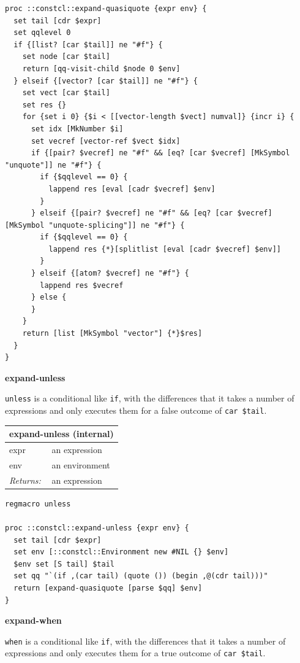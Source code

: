 \documentclass[twoside,9pt]{report}
\begin{document}
\noindent\makebox[\linewidth]{\rule{\linewidth}{0.4pt}}
\begin{lstlisting}
proc ::constcl::expand-quasiquote {expr env} {
  set tail [cdr $expr]
  set qqlevel 0
  if {[list? [car $tail]] ne "#f"} {
    set node [car $tail]
    return [qq-visit-child $node 0 $env]
  } elseif {[vector? [car $tail]] ne "#f"} {
    set vect [car $tail]
    set res {}
    for {set i 0} {$i < [[vector-length $vect] numval]} {incr i} {
      set idx [MkNumber $i]
      set vecref [vector-ref $vect $idx]
      if {[pair? $vecref] ne "#f" && [eq? [car $vecref] [MkSymbol "unquote"]] ne "#f"} {
        if {$qqlevel == 0} {
          lappend res [eval [cadr $vecref] $env]
        }
      } elseif {[pair? $vecref] ne "#f" && [eq? [car $vecref] [MkSymbol "unquote-splicing"]] ne "#f"} {
        if {$qqlevel == 0} {
          lappend res {*}[splitlist [eval [cadr $vecref] $env]]
        }
      } elseif {[atom? $vecref] ne "#f"} {
        lappend res $vecref
      } else {
      }
    }
    return [list [MkSymbol "vector"] {*}$res]
  }
}
\end{lstlisting}
\noindent\makebox[\linewidth]{\rule{\linewidth}{0.4pt}}

\textbf{expand-unless}


\texttt{unless} is a conditional like \texttt{if}, with the differences that it takes a number of expressions and only executes them for a false outcome of \texttt{car \$tail}.

\begin{tabular}{ |l l| }
\hline
\multicolumn{2}{|l|}{expand-unless (internal)} \\
\hline
expr & an expression \\
env & an environment \\
\textit{Returns:} & an expression \\
\hline
\end{tabular}

\noindent\makebox[\linewidth]{\rule{\linewidth}{0.4pt}}
\begin{lstlisting}
regmacro unless
 
proc ::constcl::expand-unless {expr env} {
  set tail [cdr $expr]
  set env [::constcl::Environment new #NIL {} $env]
  $env set [S tail] $tail
  set qq "`(if ,(car tail) (quote ()) (begin ,@(cdr tail)))"
  return [expand-quasiquote [parse $qq] $env]
}
\end{lstlisting}
\noindent\makebox[\linewidth]{\rule{\linewidth}{0.4pt}}

\textbf{expand-when}


\texttt{when} is a conditional like \texttt{if}, with the differences that it takes a number of expressions and only executes them for a true outcome of \texttt{car \$tail}.
\end{document}
